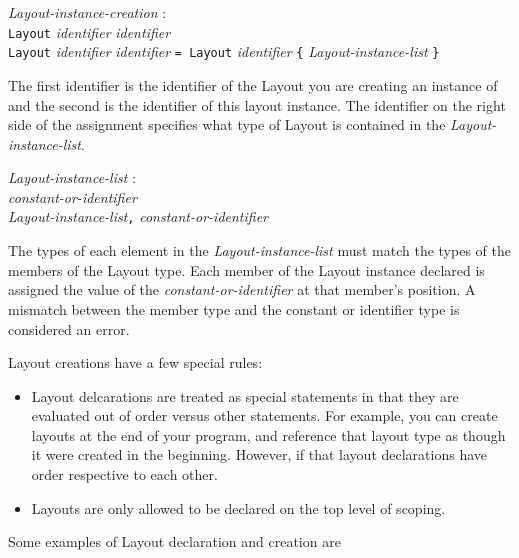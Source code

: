 \documentclass{article}
\begin{document}
\begin{tabbing}
	\= \emph{Layout}\=\emph{-instance-creation} : \\
		\> \> \texttt{Layout} \emph{identifier} \emph{identifier} \\
		\>\> \texttt{Layout} \emph{identifier} \emph{identifier} \texttt{= Layout} \emph{identifier} \texttt{\{} \emph{Layout-instance-list} \texttt{\}}
\end{tabbing}
The first identifier is the identifier of the Layout you are creating an instance of and the second is the identifier of this layout instance. The identifier on the right side of the assignment specifies what type of Layout is contained in the \emph{Layout-instance-list}.
\begin{tabbing}
	\= \emph{Layout}\=\emph{-instance-list} : \\
		\> \> \emph{constant-or-identifier} \\
		\>\> \emph{Layout-instance-list}\texttt{,} \emph{constant-or-identifier}
\end{tabbing}
The types of each element in the \emph{Layout-instance-list} must match the types of the members of the Layout type. Each member of the Layout instance declared is assigned the value of the \emph{constant-or-identifier} at that member's position. A mismatch between the member type and the constant or identifier type is considered an error. 

Layout creations have a few special rules: 
\begin{itemize}

\item Layout delcarations are treated as special statements in that they are evaluated out of order versus other statements. For example, you can create layouts at the end of your program, and reference that layout type as though it were created in the beginning. However, if that layout declarations have order respective to each other.

\item Layouts are only allowed to be declared on the top level of scoping.

\end{itemize}

Some examples of Layout declaration and creation are
\end{document}
